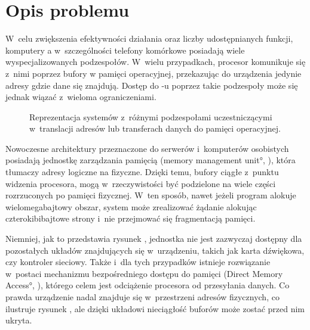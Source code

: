 \section{Opis problemu}

W~celu zwiększenia efektywności działania oraz liczby udostępnianych
funkcji, komputery a w~szczególności telefony komórkowe posiadają
wiele wyspecjalizowanych podzespołów.  W~wielu przypadkach, procesor
komunikuje się z~nimi poprzez bufory w pamięci operacyjnej,
przekazując do urządzenia jedynie adresy gdzie dane się znajdują.
Dostęp do -u poprzez takie podzespoły może się jednak wiązać
z~wieloma ograniczeniami.

\begin{figure}[tbp]
  \centering
   \qquad
  \qquad
  \caption[Różne przestrzenie adresowe dostępne
    w~komputerze.]{Reprezentacja systemów z~różnymi podzespołami
    uczestniczącymi w~translacji adresów lub transferach danych do
    pamięci operacyjnej.}
  \label{fig:mmu-iommu}
\end{figure}

Nowoczesne architektury przeznaczone do serwerów i~komputerów
osobistych posiadają jednostkę zarządzania pamięcią (\ang{memory
  management unit}, ), która tłumaczy adresy logiczne na fizyczne.
Dzięki temu, bufory ciągłe z~punktu widzenia procesora, mogą
w~rzeczywistości być podzielone na wiele części rozrzuconych po
pamięci fizycznej.  W~ten sposób, nawet jeżeli program alokuje
wielomegabajtowy obszar, system może zrealizować żądanie alokując
czterokibibajtowe strony i~nie przejmować się fragmentacją pamięci.

Niemniej, jak to przedstawia rysunek ,
jednostka  nie jest zazwyczaj dostępny dla pozostałych układów
znajdujących się w~urządzeniu, takich jak karta dźwiękowa, czy
kontroler sieciowy.  Także i~dla tych przypadków istnieje rozwiązanie
w~postaci mechanizmu bezpośredniego dostępu do pamięci (\ang{Direct
  Memory Access}, ), którego celem jest odciążenie procesora od
przesyłania danych.  Co prawda urządzenie nadal znajduje się
w~przestrzeni adresów fizycznych, co ilustruje rysunek
, ale dzięki układowi  nieciągłość
buforów może zostać przed nim ukryta.

